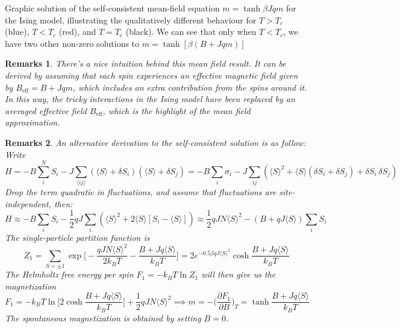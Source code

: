 \documentclass[a4paper]{article}
\newtheorem{remarks}{Remarks}[section]
\theoremstyle{new}
\begin{document}
Graphic solution of the self-consistent mean-field equation $m=\tanh\beta Jqm$ for the Ising model, illustrating the qualitatively different behaviour for $T > T_c$ (blue), $T < T_c$ (red), and $T = T_c$ (black). We can see that only when $T<T_c$, we have two other non-zero solutions to $m=\tanh[\beta(B+Jqm)]$
\begin{center}
\end{center}
\begin{remarks}
There’s a nice intuition behind this mean field result. It can be derived by assuming that each spin experiences an effective magnetic field given by $B_{\text{eff}} = B +Jqm$, which includes an extra contribution from the spins around it. In this way, the tricky interactions in the Ising model have been replaced by an averaged effective field $B_{\text{eff}}$, which is the highlight of the mean field approximation.
\end{remarks}
\newpage
\begin{remarks}
An alternative derivation to the self-consistent solution is as follow: Write 
$$H=-B\sum_i^NS_i-J\sum_{\langle ij\rangle}(\langle S\rangle+\delta S_i)(\langle S\rangle+\delta S_j)=-B\sum_i\sigma_i-J\sum_{ij}(\langle S\rangle^2+\langle S\rangle(\delta S_i+\delta S_j)+\delta S_i~\delta S_j)$$
Drop the term quadratic in fluctuations, and assume that fluctuations are site-independent, then:
$$H\approx-B\sum_iS_i-\frac{1}{2}qJ\sum_i(\langle S\rangle^2+2\langle S\rangle[S_i-\langle S\rangle])\approx\frac{1}{2}qJN\langle S\rangle^2-(B+qJ\langle S\rangle)\sum_iS_i$$
The single-particle partition function is
$$Z_1=\sum_{S=\pm1}\exp\bigg[-\frac{qJN\langle S\rangle^2}{2k_BT}-\frac{B+Jq\langle S\rangle}{k_BT}\bigg]=2e^{-0.5\beta qJ\langle S\rangle^2}\cosh\frac{B+Jq\langle S\rangle}{k_BT}$$
The Helmholtz free energy per spin $F_1=-k_BT\ln Z_1$ will then give us the magnetization
$$F_1=-k_BT\ln\bigg[2\cosh\frac{B+Jq\langle S\rangle}{k_BT}\bigg]+\frac{1}{2}qJN\langle S\rangle^2\implies m=-\bigg(\frac{\partial F_1}{\partial B}\bigg)_T=\tanh\frac{B+Jq\langle S\rangle}{k_BT}$$
The spontaneous magnetization is obtained by setting $B=0$.
\end{remarks}
\end{document}
